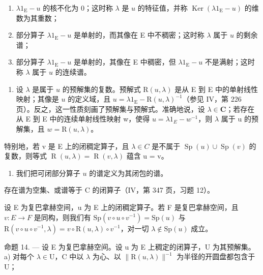 \begin{enumerate}
\def\labelenumi{(\roman{enumi})}
\item
  \(\lambda 1_{\mathrm{E}} - u\) 的核不化为 0；这时称 \(\lambda\) 是 \(u\) 的特征值，并称 \(\operatorname{Ker}(\lambda 1_{\mathrm{E}} - u)\) 的维数为其重数；
\item
  部分算子 \(\lambda 1_{\mathrm{E}} - u\) 是单射的，而其像在 E 中不稠密；这时称 \(\lambda\) 属于 \(u\) 的剩余谱；
\item
  部分算子 \(\lambda 1_{\mathrm{E}} - u\) 是单射的，其像在 E 中稠密，但 \(\lambda 1_{\mathrm{E}} - u\) 不是满射；这时称 \(\lambda\) 属于 \(u\) 的连续谱。
\end{enumerate}

\begin{enumerate}
\def\labelenumi{\arabic{enumi})}
\setcounter{enumi}{4}
\tightlist
\item
  设 \(\lambda\) 是属于 \(u\) 的预解集的复数。预解式 \(\mathrm{R}(u,\lambda)\) 是从 E 到 E 中的单射线性映射；其像是 \(u\) 的定义域，且 \(u = \lambda 1_{\mathrm{E}} - \mathrm{R}(u,\lambda)^{-1}\)（参见 IV，第 226 页）。反之，这一性质刻画了预解集与预解式。准确地说，设 \(\lambda \in \mathbf{C}\)；若存在从 E 到 E 中的连续单射线性映射 w，使得 \(u = \lambda 1_{E} - w^{-1}\)，则 \(\lambda\) 属于 u 的预解集，且 \(w = \mathrm{R}(u, \lambda)\)。
\end{enumerate}

特别地，若 v 是 E 上的闭稠定算子，且 \(\lambda \in C\) 是不属于 \(\operatorname{Sp}(u) \cup \operatorname{Sp}(v)\) 的复数，则等式 \(\operatorname{R}(u, \lambda) = \operatorname{R}(v, \lambda)\) 蕴含 u = v。

\begin{enumerate}
\def\labelenumi{\arabic{enumi})}
\setcounter{enumi}{5}
\tightlist
\item
  我们把可闭部分算子 \(u\) 的谱定义为其闭包的谱。
\end{enumerate}

存在谱为空集、或谱等于 C 的闭算子（IV，第 347 页，习题 12）。

设 E 为复巴拿赫空间，u 为 E 上的闭稠定算子。若 F 是复巴拿赫空间，且 \(v: E \to F\) 是同构，则我们有 \(\mathrm{Sp}(v \circ u \circ v^{-1}) = \mathrm{Sp}(u)\) 与 \(\mathrm{R}(v \circ u \circ v^{-1}, \lambda) = v \circ \mathrm{R}(u, \lambda) \circ v^{-1}\)，对一切 \(\lambda \notin \mathrm{Sp}(u)\) 成立。

命题 14. --- 设 E 为复巴拿赫空间。设 u 为 E 上稠定的闭算子，U 为其预解集。a) 对每个 \(\lambda\in\mathrm{U}\)，C 中以 \(\lambda\) 为心、以 \(\|\mathrm{R}(u,\lambda)\|^{-1}\) 为半径的开圆盘都包含于 U；

